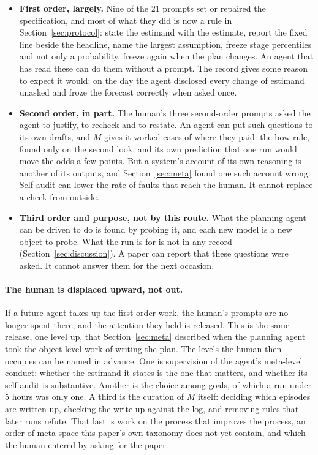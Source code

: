 \documentclass[11pt,a4paper]{article}
\begin{document}
\begin{itemize}[leftmargin=1.6em,itemsep=3pt]
\item \textbf{First order, largely.} Nine of the 21 prompts set or repaired the specification, and most of what they did is now a rule in Section~\ref{sec:protocol}: state the estimand with the estimate, report the fixed line beside the headline, name the largest assumption, freeze stage percentiles and not only a probability, freeze again when the plan changes. An agent that has read these can do them without a prompt. The record gives some reason to expect it would: on the day the agent disclosed every change of estimand unasked and froze the forecast correctly when asked once.
\item \textbf{Second order, in part.} The human's three second-order prompts asked the agent to justify, to recheck and to restate. An agent can put such questions to its own drafts, and $M$ gives it worked cases of where they paid: the bow rule, found only on the second look, and its own prediction that one run would move the odds a few points. But a system's account of its own reasoning is another of its outputs, and Section~\ref{sec:meta} found one such account wrong. Self-audit can lower the rate of faults that reach the human. It cannot replace a check from outside.
\item \textbf{Third order and purpose, not by this route.} What the planning agent can be driven to do is found by probing it, and each new model is a new object to probe. What the run is for is not in any record (Section~\ref{sec:discussion}). A paper can report that these questions were asked. It cannot answer them for the next occasion.
\end{itemize}

\paragraph{The human is displaced upward, not out.} If a future agent takes up the first-order work, the human's prompts are no longer spent there, and the attention they held is released. This is the same release, one level up, that Section~\ref{sec:meta} described when the planning agent took the object-level work of writing the plan. The levels the human then occupies can be named in advance. One is supervision of the agent's meta-level conduct: whether the estimand it states is the one that matters, and whether its self-audit is substantive. Another is the choice among goals, of which a run under 5 hours was only one. A third is the curation of $M$ itself: deciding which episodes are written up, checking the write-up against the log, and removing rules that later runs refute. That last is work on the process that improves the process, an order of meta space this paper's own taxonomy does not yet contain, and which the human entered by asking for the paper.
\end{document}
